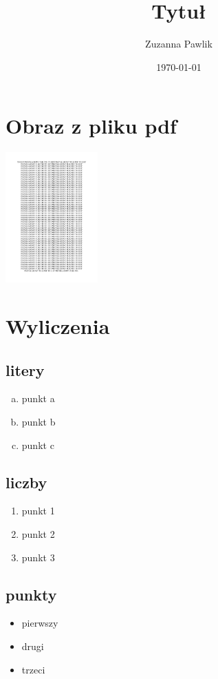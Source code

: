 \documentclass{article}
\title{Tytuł}
\author{Zuzanna Pawlik}
\date{\today}
\theoremstyle{definition}
\begin{document}
\maketitle
\section*{Obraz z pliku pdf}
\begin{center}
	\includegraphics[height=5cm]{obraz1.pdf}
\end{center}


\section*{Wyliczenia}
\subsection*{litery}
\begin{enumerate}[a)]
	\item punkt a
	\item punkt b
	\item punkt c
\end{enumerate}

\subsection*{liczby}
\begin{enumerate}
	\item punkt 1
	\item punkt 2
	\item punkt 3
\end{enumerate}

\subsection*{punkty}
\begin{itemize}
	\item pierwszy
	\item drugi
	\item trzeci
\end{itemize}
\end{document}
